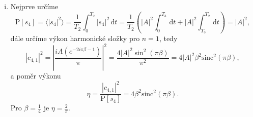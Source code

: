\documentclass{article}
\begin{document}
\begin{enumerate}[(i)]
\item Nejprve určíme
\[
    \text{P}\left[s_4\right] = \langle |s_4|^2\rangle = \frac{1}{T_2}\int_{0}^{T_2}|s_4|^2 \,\mathrm{d}t = \frac{1}{T_2}\left(|A|^2\int_{0}^{T_3}\,\mathrm{d}t +|A|^2\int_{T_3}^{T_2}\,\mathrm{d}t \right) = |A|^2,
\]
dále určíme výkon harmonické složky pro $n = 1$, tedy
\[
    |c_{4,1}|^2 = \left| \frac{i A \left(e^{-2 i \pi  \beta-1 }\right)}{\pi }\right|^2 = \frac{4 |A|^2 \sin ^2(\pi  \beta )}{\pi ^2} = 4|A|^2\beta^2\text{sinc}^2(\pi\beta),
\]
a poměr výkonu
\[
    \eta = \frac{|c_{4,1}|^2}{\text{P}\left[s_4\right]} = 4\beta^2 \text{sinc}^2(\pi\beta).
\]
Pro $\beta = \frac{1}{4}$ je $\eta = \frac{2}{\pi}$.

\end{enumerate}
\end{document}
